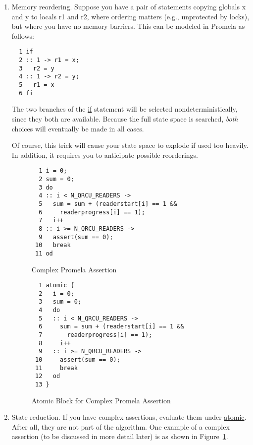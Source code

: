 \begin{enumerate}
\item	Memory reordering.  Suppose you have a pair of statements
	copying globals x and y to locals r1 and r2, where ordering
	matters (e.g., unprotected by locks), but where you have
	no memory barriers.  This can be modeled in Promela as follows:

\vspace{5pt}
\begin{minipage}[t]{\columnwidth}
\begin{verbatim}
  1 if
  2 :: 1 -> r1 = x; 
  3   r2 = y
  4 :: 1 -> r2 = y; 
  5   r1 = x
  6 fi
\end{verbatim}
\end{minipage}
\vspace{5pt}

	The two branches of the \url{if} statement will be selected
	nondeterministically, since they both are available.
	Because the full state space is searched, \emph{both} choices
	will eventually be made in all cases.

	Of course, this trick will cause your state space to explode
	if used too heavily.
	In addition, it requires you to anticipate possible reorderings.

\begin{figure}[tbp]
{ %
\begin{verbatim}
  1 i = 0;  
  2 sum = 0;
  3 do      
  4 :: i < N_QRCU_READERS ->
  5   sum = sum + (readerstart[i] == 1 && 
  6     readerprogress[i] == 1);
  7   i++     
  8 :: i >= N_QRCU_READERS ->
  9   assert(sum == 0);
 10   break   
 11 od
\end{verbatim}
}
\caption{Complex Promela Assertion}
\label{fig:analysis:Complex Promela Assertion}
\end{figure}

\begin{figure}[tbp]
{ %
\begin{verbatim}
  1 atomic {
  2   i = 0;  
  3   sum = 0;
  4   do
  5   :: i < N_QRCU_READERS ->
  6     sum = sum + (readerstart[i] == 1 && 
  7       readerprogress[i] == 1);
  8     i++
  9   :: i >= N_QRCU_READERS ->
 10     assert(sum == 0);
 11     break
 12   od
 13 }
\end{verbatim}
}
\caption{Atomic Block for Complex Promela Assertion}
\label{fig:analysis:Atomic Block for Complex Promela Assertion}
\end{figure}

\item	State reduction.  If you have complex assertions, evaluate
	them under \url{atomic}.  After all, they are not part of the
	algorithm.  One example of a complex assertion (to be discussed
	in more detail later) is as shown in
	Figure~\ref{fig:analysis:Complex Promela Assertion}.


\end{enumerate}

